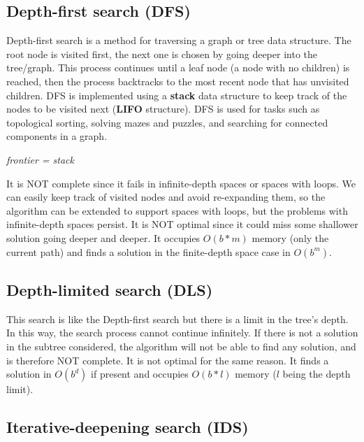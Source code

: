 \documentclass{article}
\begin{document}
\subsection{Depth-first search (DFS)}

Depth-first search is a method for traversing a graph or tree data structure. The root node is visited first, the next one is chosen by going deeper into the tree/graph. This process continues until a leaf node (a node with no children) is reached, then the process backtracks to the most recent node that has unvisited children. DFS is implemented using a \textbf{stack} data structure to keep track of the nodes to be visited next (\textbf{LIFO} structure). DFS is used for tasks such as topological sorting, solving mazes and puzzles, and searching for connected components in a graph.

\begin{center}
    \textit{frontier = stack}
\end{center}

It is NOT complete since it fails in infinite-depth spaces or spaces with loops. We can easily keep track of visited nodes and avoid re-expanding them, so the algorithm can be extended to support spaces with loops, but the problems with infinite-depth spaces persist. It is NOT optimal since it could miss some shallower solution going deeper and deeper. It occupies $O(b * m)$ memory (only the current path) and finds a solution in the finite-depth space case in $O(b^m)$. 

\newpage

\subsection{Depth-limited search (DLS)}

This search is like the Depth-first search but there is a limit in the tree's depth. In this way, the search process cannot continue infinitely. If there is not a solution in the subtree considered, the algorithm will not be able to find any solution, and is therefore NOT complete. It is not optimal for the same reason. It finds a solution in $O(b^d)$ if present and occupies $O(b*l)$ memory ($l$ being the depth limit).

\newpage

\subsection{Iterative-deepening search (IDS)}
\end{document}
